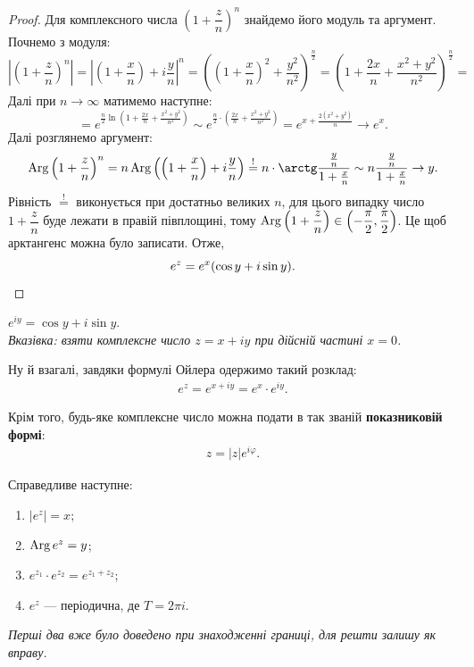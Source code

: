\documentclass{math_library}
\begin{document}
\begin{proof}
Для комплексного числа $\left( 1 + \dfrac{z}{n} \right)^n$ знайдемо його модуль та аргумент. Почнемо з модуля:
\[
\left| \left( 1 + \dfrac{z}{n} \right)^n \right| = \left| \left( 1 + \dfrac{x}{n} \right) + i\dfrac{y}{n} \right|^n = \left( \left( 1 + \dfrac{x}{n}\right)^2 + \dfrac{y^2}{n^2} \right)^{\frac{n}{2}} = \left( 1 + \dfrac{2x}{n} + \dfrac{x^2+y^2}{n^2} \right)^{\frac{n}{2}} \boxed{=}
\]
Далі при $n \to \infty$ матимемо наступне:
\[
\boxed{=} e^{\frac{n}{2} \ln \left( 1 + \frac{2x}{n} + \frac{x^2+y^2}{n^2} \right)} \sim e^{\frac{n}{2} \cdot \left( \frac{2x}{n} + \frac{x^2+y^2}{n^2} \right)} = e^{x + \frac{2(x^2+y^2)}{n}} \to e^x.
\]
Далі розглянемо аргумент:
\[
\Arg \left( 1 + \dfrac{z}{n} \right)^n = n \Arg \left( \left( 1 + \dfrac{x}{n} \right) + i \dfrac{y}{n} \right) \overset{!}{=} n \cdot \arctg \dfrac{\frac{y}{n}}{1 + \frac{x}{n}} \sim n \dfrac{\frac{y}{n}}{1 + \frac{x}{n}} \to y.
\]
Рівність $\overset{!}{=}$ виконується при достатньо великих $n$, для цього випадку число $1 + \dfrac{z}{n}$ буде лежати в правій півплощині, тому $\operatorname{Arg} \left( 1 + \dfrac{z}{n} \right) \in \left( -\dfrac{\pi}{2}, \dfrac{\pi}{2} \right)$. Це щоб арктангенс можна було записати. Отже,
\[
e^z = e^x (\cos y + i \sin y). \qedhere
\]
\end{proof}

\begin{corollary}
$e^{iy} = \cos y + i \sin y.$\\
\textit{Вказівка: взяти комплексне число $z = x + iy$ при дійсній частині $x = 0$.}
\end{corollary}

Ну й взагалі, завдяки формулі Ойлера одержимо такий розклад:
\begin{align*}
e^{z} = e^{x+iy} = e^x \cdot e^{iy}.
\end{align*}

Крім того, будь-яке комплексне число можна подати в так званій \textbf{показниковій формі}:
\begin{align*}
z = |z| e^{i \varphi}.
\end{align*}

\begin{proposition}
Справедливе наступне:
\begin{enumerate}[nosep, wide=0pt, label={\arabic*)}]
\item $|e^z| = x$;
\item $\operatorname{Arg} e^z = y$;
\item $e^{z_1} \cdot e^{z_2} = e^{z_1+z_2}$;
\item $e^z$ --- періодична, де $T = 2\pi i$.
\end{enumerate}
\textit{Перші два вже було доведено при знаходженні границі, для решти залишу як вправу.}
\end{proposition}
\end{document}
